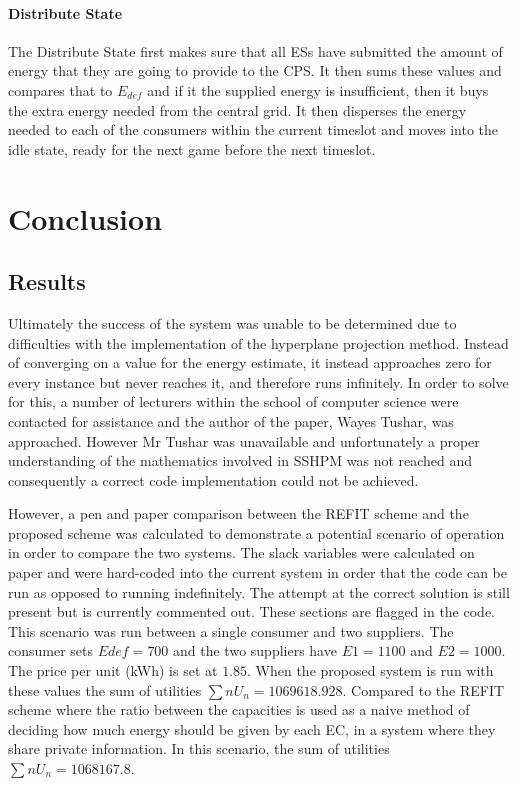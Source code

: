 \documentclass[a4paper, notitlepage]{report}
\begin{document}
\subsection{Distribute State}
\label{sec:org54dcdaf}
The Distribute State first makes sure that all ESs have submitted the amount of
energy that they are going to provide to the CPS. It then sums these values and
compares that to \(E_{def}\) and if it the supplied energy is insufficient, then it
buys the extra energy needed from the central grid. It then disperses the energy
needed to each of the consumers within the current timeslot and moves into the
idle state, ready for the next game before the next timeslot.
\part{Conclusion}
\label{sec:orgadc1155}
\chapter{Results}
\label{sec:orgefbe009}
Ultimately the success of the system was unable to be determined due to
difficulties with the implementation of the hyperplane projection method.
Instead of converging on a value for the energy estimate, it instead approaches
zero for every instance but never reaches it, and therefore runs infinitely. In
order to solve for this, a number of lecturers within the school of computer
science were contacted for assistance and the author of the paper, Wayes Tushar,
was approached. However Mr Tushar was unavailable and unfortunately a proper
understanding of the mathematics involved in SSHPM was not reached and
consequently a correct code implementation could not be achieved.

However, a pen and paper comparison between the REFIT scheme and the proposed
scheme was calculated to demonstrate a potential scenario of operation in order
to compare the two systems. The slack variables were calculated on paper and
were hard-coded into the current system in order that the code can be run as
opposed to running indefinitely. The attempt at the correct solution is still
present but is currently commented out. These sections are flagged in the code.
This scenario was run between a single consumer and two suppliers. The consumer
sets \(Edef= 700\) and the two suppliers have \(E1 = 1100\) and \(E2 = 1000\). The
price per unit (kWh) is set at \(1.85\). When the proposed system is run with
these values the sum of utilities \(∑n U_n = 1069618.928\). Compared to the REFIT
scheme where the ratio between the capacities is used as a naive method of
deciding how much energy should be given by each EC, in a system where they
share private information. In this scenario, the sum of utilities \(∑n U_n =
1068167.8\).
\end{document}
